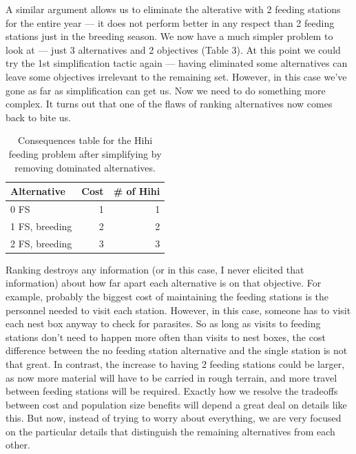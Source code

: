 \documentclass[]{book}
\begin{document}
A similar argument allows us to eliminate the alterative with 2 feeding
stations for the entire year --- it does not perform better in any
respect than 2 feeding stations just in the breeding season. We now have
a much simpler problem to look at --- just 3 alternatives and 2
objectives (Table 3). At this point we could try the 1st simplification
tactic again --- having eliminated some alternatives can leave some
objectives irrelevant to the remaining set. However, in this case we've
gone as far as simplification can get us. Now we need to do something
more complex. It turns out that one of the flaws of ranking alternatives
now comes back to bite us.

\begin{table}[tbp]
\caption{Consequences table for the Hihi feeding problem after simplifying by removing dominated alternatives.\label{tab:hihi_con3}}
\begin{tabular}{lrr}
\toprule
   \textbf{Alternative}
  &\textbf{Cost}
  &\textbf{\# of Hihi}
\\\midrule
   0 FS           & 1 & 1 
\\ 1 FS, breeding & 2 & 2 
\\ 2 FS, breeding & 3 & 3 
\\\bottomrule
\end{tabular}
\end{table}

Ranking destroys any information (or in this case, I never elicited that
information) about how far apart each alternative is on that objective.
For example, probably the biggest cost of maintaining the feeding
stations is the personnel needed to visit each station. However, in this
case, someone has to visit each nest box anyway to check for parasites.
So as long as visits to feeding stations don't need to happen more often
than visits to nest boxes, the cost difference between the no feeding
station alternative and the single station is not that great. In
contrast, the increase to having 2 feeding stations could be larger, as
now more material will have to be carried in rough terrain, and more
travel between feeding stations will be required. Exactly how we resolve
the tradeoffs between cost and population size benefits will depend a
great deal on details like this. But now, instead of trying to worry
about everything, we are very focused on the particular details that
distinguish the remaining alternatives from each other.
\end{document}
